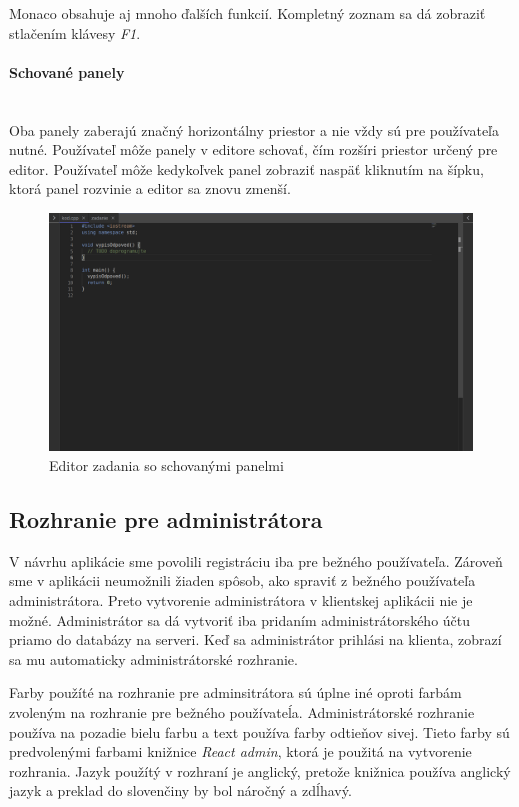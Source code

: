 Monaco obsahuje aj mnoho ďalších funkcií. Kompletný zoznam sa dá zobraziť stlačením klávesy
\textit{F1}. 

\paragraph{Schované panely}\leavevmode\\
Oba panely zaberajú značný horizontálny priestor a nie vždy sú pre používateľa nutné. Používateľ
môže panely v editore schovať, čím rozšíri priestor určený pre editor. Používateľ môže kedykoľvek
panel zobraziť naspäť kliknutím na šípku, ktorá panel rozvinie a editor sa znovu zmenší. 
\begin{figure}[H]
\centerline{\includegraphics[width=1\textwidth]{images/zcucnute_panely}}
\caption[Editor zadania so schovanými panelmi]{Editor zadania so schovanými panelmi}
\label{obr:zcucnute_panely}
\end{figure}

\subsection{Rozhranie pre administrátora}
V návrhu aplikácie sme povolili registráciu iba pre bežného používateľa. Zároveň sme v aplikácii
neumožnili žiaden spôsob, ako spraviť z bežného používateľa administrátora. Preto vytvorenie
administrátora v klientskej aplikácii nie je možné. Administrátor sa dá vytvoriť iba pridaním
administrátorského účtu priamo do databázy na serveri. Keď sa administrátor prihlási na klienta,
zobrazí sa mu automaticky administrátorské rozhranie.

Farby použíté na rozhranie pre adminsitrátora sú úplne iné oproti farbám zvoleným na rozhranie pre
bežného používateĺa. Administrátorské rozhranie používa na pozadie bielu farbu a text používa farby
odtieňov sivej. Tieto farby sú predvolenými farbami knižnice \textit{React admin}, ktorá je použitá
na vytvorenie rozhrania. Jazyk použítý v rozhraní je anglický, pretože knižnica používa anglický
jazyk a preklad do slovenčiny by bol náročný a zdĺhavý.

